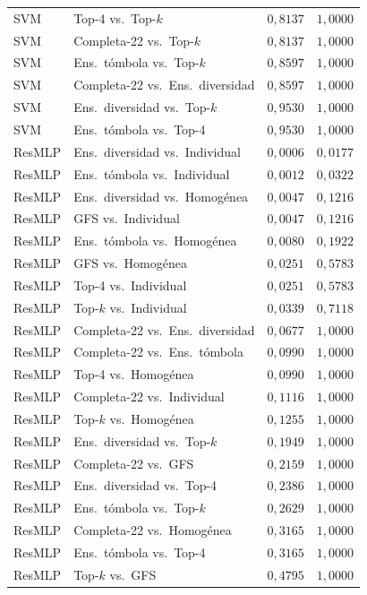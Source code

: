 \documentclass[11pt,a4paper]{article}
\begin{document}
\begin{table}[H]
\begin{tabular}{@{}llrr@{}}
SVM & Top-4 vs.\ Top-$k$ & $0{,}8137$ & $1{,}0000$ \\
SVM & Completa-22 vs.\ Top-$k$ & $0{,}8137$ & $1{,}0000$ \\
SVM & Ens.\ tómbola vs.\ Top-$k$ & $0{,}8597$ & $1{,}0000$ \\
SVM & Completa-22 vs.\ Ens.\ diversidad & $0{,}8597$ & $1{,}0000$ \\
SVM & Ens.\ diversidad vs.\ Top-$k$ & $0{,}9530$ & $1{,}0000$ \\
SVM & Ens.\ tómbola vs.\ Top-4 & $0{,}9530$ & $1{,}0000$ \\
ResMLP & Ens.\ diversidad vs.\ Individual & $0{,}0006$ & $0{,}0177$ \\
ResMLP & Ens.\ tómbola vs.\ Individual & $0{,}0012$ & $0{,}0322$ \\
ResMLP & Ens.\ diversidad vs.\ Homogénea & $0{,}0047$ & $0{,}1216$ \\
ResMLP & GFS vs.\ Individual & $0{,}0047$ & $0{,}1216$ \\
ResMLP & Ens.\ tómbola vs.\ Homogénea & $0{,}0080$ & $0{,}1922$ \\
ResMLP & GFS vs.\ Homogénea & $0{,}0251$ & $0{,}5783$ \\
ResMLP & Top-4 vs.\ Individual & $0{,}0251$ & $0{,}5783$ \\
ResMLP & Top-$k$ vs.\ Individual & $0{,}0339$ & $0{,}7118$ \\
ResMLP & Completa-22 vs.\ Ens.\ diversidad & $0{,}0677$ & $1{,}0000$ \\
ResMLP & Completa-22 vs.\ Ens.\ tómbola & $0{,}0990$ & $1{,}0000$ \\
ResMLP & Top-4 vs.\ Homogénea & $0{,}0990$ & $1{,}0000$ \\
ResMLP & Completa-22 vs.\ Individual & $0{,}1116$ & $1{,}0000$ \\
ResMLP & Top-$k$ vs.\ Homogénea & $0{,}1255$ & $1{,}0000$ \\
ResMLP & Ens.\ diversidad vs.\ Top-$k$ & $0{,}1949$ & $1{,}0000$ \\
ResMLP & Completa-22 vs.\ GFS & $0{,}2159$ & $1{,}0000$ \\
ResMLP & Ens.\ diversidad vs.\ Top-4 & $0{,}2386$ & $1{,}0000$ \\
ResMLP & Ens.\ tómbola vs.\ Top-$k$ & $0{,}2629$ & $1{,}0000$ \\
ResMLP & Completa-22 vs.\ Homogénea & $0{,}3165$ & $1{,}0000$ \\
ResMLP & Ens.\ tómbola vs.\ Top-4 & $0{,}3165$ & $1{,}0000$ \\
ResMLP & Top-$k$ vs.\ GFS & $0{,}4795$ & $1{,}0000$ \\

\end{tabular}
\end{table}
\end{document}
